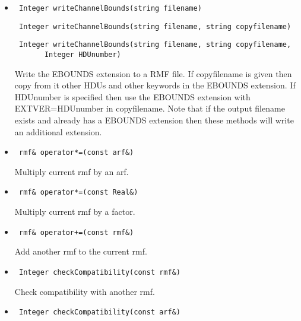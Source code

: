 \documentclass[11pt]{book}
\begin{document}
\begin{itemize}
\item  \begin{verbatim} Integer writeChannelBounds(string filename) \end{verbatim}
       \begin{verbatim} Integer writeChannelBounds(string filename, string copyfilename) \end{verbatim}
       \begin{verbatim} Integer writeChannelBounds(string filename, string copyfilename,
       Integer HDUnumber) \end{verbatim}

          Write the EBOUNDS extension to a RMF file. If copyfilename is 
          given then copy from it other HDUs and other keywords in the 
          EBOUNDS extension. If HDUnumber is specified then use the
          EBOUNDS extension with EXTVER=HDUnumber in copyfilename. Note 
          that if the output filename exists and already has a EBOUNDS 
          extension then these methods will write an additional extension.

\item  \begin{verbatim} rmf& operator*=(const arf&) \end{verbatim}

          Multiply current rmf by an arf.

\item  \begin{verbatim} rmf& operator*=(const Real&) \end{verbatim}

          Multiply current rmf by a factor.

\item  \begin{verbatim} rmf& operator+=(const rmf&) \end{verbatim}

          Add another rmf to the current rmf.

\item  \begin{verbatim} Integer checkCompatibility(const rmf&) \end{verbatim}

          Check compatibility with another rmf.

\item  \begin{verbatim} Integer checkCompatibility(const arf&) \end{verbatim}


\end{itemize}
\end{document}
